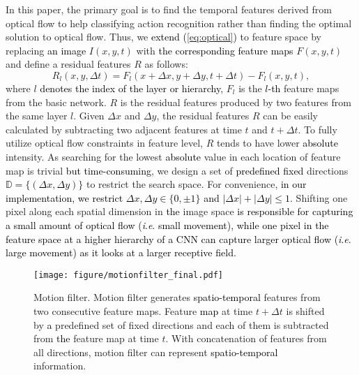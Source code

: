 \documentclass[runningheads]{llncs}
\newcommand{\ie}{\textit{i}.\textit{e}. }
\newcommand{\nj}[1]{\textcolor{black}{#1}}
\newcommand{\mg}[1]{\textcolor{black}{#1}}
\begin{document}
In this paper, the primary goal is to find the temporal features derived from optical flow to help classifying action recognition rather than finding the optimal solution to optical flow. Thus, we \nj{extend (\ref{eq:optical})} to feature space by replacing \nj{an image} ${I}(x,y,t)$ with \nj{the corresponding feature maps} ${F}(x,y,t)$ and define a residual features ${R}$ as follows:
\begin{equation}
\label{eq:residual}
R_l(x,y,\Delta{t}) =F_l(x+\Delta{x},y+\Delta{y},t+\Delta{t}) - 
F_l(x,y,t),
\end{equation}
where $\textit{l}$ \nj{denotes the index of the layer or hierarchy}, ${F}_l$ is the \nj{$l$-th} feature maps from the basic network.
${R}$ is the residual features produced by two features from the same layer $l$. Given $\Delta{x}$ and $\Delta{y}$, the residual features $R$ can be easily calculated by subtracting two adjacent features at time $t$ and $t+\Delta{t}$. To fully utilize optical flow constraints in feature level, $R$ tends to have lower \nj{absolute} intensity. As searching for the lowest \nj{absolute} value in each location of feature map is trivial \nj{but time-consuming}, we design a set of \nj{predefined fixed} directions \nj{$\mathbb{D} = \{(\Delta{x}, \Delta{y})\}$} to restrict the search space. For convenience, \nj{in our implementation,} \mg{we \nj{restrict} $\Delta{x}, \Delta{y}\in{\{0,\pm 1\}}$ and $\left|\Delta{x}\right|+\left|\Delta{y}\right|\le 1$.} Shifting one pixel along each spatial dimension in \nj{the} image space 
\nj{is responsible for capturing a small amount of optical flow (\ie small movement), 
while one pixel in the feature space at a higher hierarchy of a CNN can capture larger optical flow (\ie large movement) as it looks at a larger receptive field.}

\begin{figure}[t]
	\centering
    \texttt{[image: figure/motionfilter\_final.pdf]}
    \caption{Motion filter.
Motion filter generates \nj{spatio-temporal} features from two consecutive feature maps. Feature \nj{map} at time $t+\Delta{t}$ is shifted by \nj{a} predefined set of fixed directions and each of them is subtracted from \nj{the} feature map at time $t$. With concatenation of features from all directions, motion filter can represent \nj{spatio-temporal} information.
    }
    \label{fig:motionfilter_shifting}
\end{figure}
\end{document}
